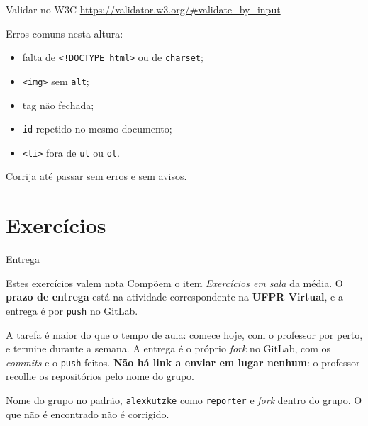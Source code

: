 \documentclass{beamer}
\begin{document}
\begin{frame}[fragile]{Validar no W3C}
  \url{https://validator.w3.org/#validate_by_input}

  \vspace{0.5cm}
  Erros comuns nesta altura:
  \begin{itemize}
    \item falta de \texttt{<!DOCTYPE html>} ou de \texttt{charset};
    \item \texttt{<img>} sem \texttt{alt};
    \item tag não fechada;
    \item \texttt{id} repetido no mesmo documento;
    \item \texttt{<li>} fora de \texttt{ul} ou \texttt{ol}.
  \end{itemize}

  \vspace{0.3cm}
  Corrija até passar sem erros e sem avisos.
\end{frame}

\section{Exercícios}

\begin{frame}{Entrega}
  \begin{block}{Estes exercícios valem nota}
    Compõem o item \textit{Exercícios em sala} da média. O \textbf{prazo de
    entrega} está na atividade correspondente na \textbf{UFPR Virtual}, e a
    entrega é por \texttt{push} no GitLab.
  \end{block}

  \vspace{0.4cm}
  A tarefa é maior do que o tempo de aula: comece hoje, com o professor por
  perto, e termine durante a semana. A entrega é o próprio \textit{fork} no
  GitLab, com os \textit{commits} e o \texttt{push} feitos. \textbf{Não há link a enviar em lugar nenhum}: o
  professor recolhe os repositórios pelo nome do grupo.

  \vspace{0.4cm}
  Nome do grupo no padrão, \texttt{alexkutzke} como \texttt{reporter} e
  \textit{fork} dentro do grupo. O que não é encontrado não é corrigido.
\end{frame}
\end{document}
